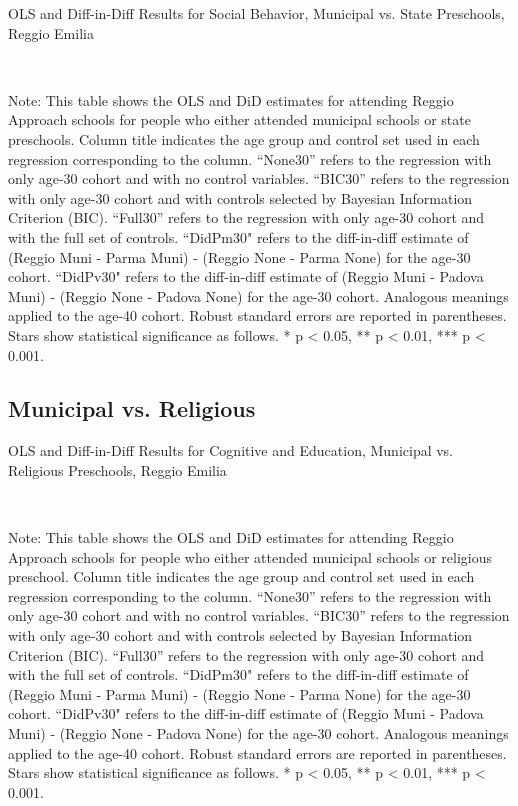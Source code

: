 \begin{landscape}
\begin{table}[H] \caption{OLS and Diff-in-Diff Results for Social Behavior, Municipal vs. State Preschools, Reggio Emilia} \label{ols-S-reg}
\scalebox{0.85}{
}
\vspace{1ex} \\
\footnotesize\raggedright{Note: This table shows the OLS and DiD estimates for attending Reggio Approach schools for people who either attended municipal schools or state preschools. Column title indicates the age group and control set used in each regression corresponding to the column. ``None30'' refers to the regression with only age-30 cohort and with no control variables. ``BIC30'' refers to the regression with only age-30 cohort and with controls selected by Bayesian Information Criterion (BIC). ``Full30'' refers to the regression with only age-30 cohort and with the full set of controls. ``DidPm30" refers to the diff-in-diff estimate of (Reggio Muni - Parma Muni) - (Reggio None - Parma None) for the age-30 cohort. ``DidPv30" refers to the diff-in-diff estimate of (Reggio Muni - Padova Muni) - (Reggio None - Padova None) for the age-30 cohort. Analogous meanings applied to the age-40 cohort. Robust standard errors are reported in parentheses. Stars show statistical significance as follows. * p < 0.05, ** p < 0.01, *** p < 0.001.}
\end{table}




\subsection{Municipal vs. Religious}
\begin{table}[H] \caption{OLS and Diff-in-Diff Results for Cognitive and Education, Municipal vs. Religious Preschools, Reggio Emilia} \label{ols-E-reg}
\scalebox{0.85}{}
\vspace{1ex} \\
\footnotesize\raggedright{Note: This table shows the OLS and DiD estimates for attending Reggio Approach schools for people who either attended municipal schools or religious preschool. Column title indicates the age group and control set used in each regression corresponding to the column. ``None30'' refers to the regression with only age-30 cohort and with no control variables. ``BIC30'' refers to the regression with only age-30 cohort and with controls selected by Bayesian Information Criterion (BIC). ``Full30'' refers to the regression with only age-30 cohort and with the full set of controls. ``DidPm30" refers to the diff-in-diff estimate of (Reggio Muni - Parma Muni) - (Reggio None - Parma None) for the age-30 cohort. ``DidPv30" refers to the diff-in-diff estimate of (Reggio Muni - Padova Muni) - (Reggio None - Padova None) for the age-30 cohort. Analogous meanings applied to the age-40 cohort. Robust standard errors are reported in parentheses. Stars show statistical significance as follows. * p < 0.05, ** p < 0.01, *** p < 0.001.}
\end{table}


\end{landscape}
